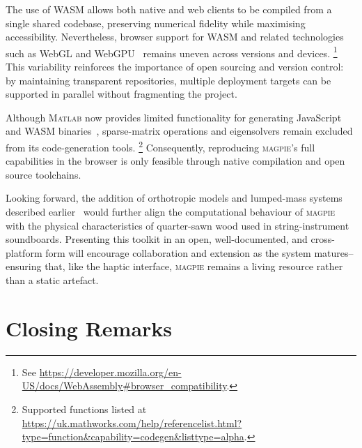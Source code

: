 The use of WASM allows both native and web clients to be compiled from a single shared codebase, preserving numerical fidelity while maximising accessibility. Nevertheless, browser support for WASM and related technologies such as WebGL and WebGPU~\cite{chickerur_webgl_2024} remains uneven across versions and devices.%
\footnote{See \url{https://developer.mozilla.org/en-US/docs/WebAssembly\#browser_compatibility}.}  
This variability reinforces the importance of open sourcing and version control: by maintaining transparent repositories, multiple deployment targets can be supported in parallel without fragmenting the project.

Although M\textsc{atlab} now provides limited functionality for generating JavaScript and WASM binaries~\cite{mcvittie_generatejavascriptusingmatlabcoder_2021}, sparse-matrix operations and eigensolvers remain excluded from its code-generation tools.%
\footnote{Supported functions listed at \url{https://uk.mathworks.com/help/referencelist.html?type=function&capability=codegen&listtype=alpha}.}  
Consequently, reproducing \textsc{magpie}'s full capabilities in the browser is only feasible through native compilation and open source toolchains.

Looking forward, the addition of orthotropic models and lumped-mass systems described earlier~\cite{ducceschi_open_2024} would further align the computational behaviour of \textsc{magpie} with the physical characteristics of quarter-sawn wood used in string-instrument soundboards. Presenting this toolkit in an open, well-documented, and cross-platform form will encourage collaboration and extension as the system matures--ensuring that, like the haptic interface, \textsc{magpie} remains a living resource rather than a static artefact.




\section{Closing Remarks}

